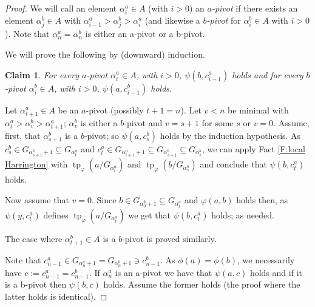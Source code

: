 \documentclass[a4paper]{amsart}
\theoremstyle{plain}
\newtheorem{claim}{Claim}[theorem]
\theoremstyle{definition}
\theoremstyle{remark}
\numberwithin{equation}{section}
\newenvironment{claimproof}[1][\proofname]
  {%
    \proof[#1]%
      \renewcommand*\qedsymbol{$\square$ (claim)}%
  }
  {%
    \endproof%
  }
\DeclareMathOperator{\tp}{tp}
\begin{document}
\begin{proof}
We will call an element $\alpha_i^a\in A$ (with $i>0$) an \emph{$a$-pivot} if there exists an element $\alpha_j^b\in A$ with $\alpha^a_{i-1}>\alpha_j^b>\alpha_i^a$ (and likewise a \emph{$b$-pivot} for $\alpha_i^b\in A$ with $i>0$). Note that $\alpha^a_n=\alpha^b_n$ is either an a-pivot or a b-pivot.

We will prove the following by (downward) induction.
\begin{claim}
For every $a$-pivot $\alpha_i^a\in A$, with $i>0$, $\psi(b,c^a_{i-1})$ holds and for every $b$-pivot $\alpha_i^b\in A$, with $i>0$, $\psi(a,c^b_{i-1})$ holds.
\end{claim}
\begin{claimproof}
%
%
%
Let $\alpha^a_{t+1}\in A$ be an $a$-pivot (possibly $t+1=n$). Let $v<n$ be minimal with $\alpha^a_t>\alpha^b_{v}>\alpha^a_{t+1}$; $\alpha^b_v$ is either a $b$-pivot and $v=s+1$ for some $s$ or $v=0$. Assume, first, that $\alpha^b_{s+1}$ is a $b$-pivot; so $\psi(a,c^b_s)$ holds by the induction hypothesis. As $c^b_s\in G_{\alpha^b_{s+1}+1}\subseteq G_{\alpha_t^a}$ and $c^a_t\in G_{\alpha^a_{t+1}+1}\subseteq G_{\alpha^b_{s+1}}\subseteq G_{\alpha^b_s}$, we can apply Fact \ref{F:local Harrington} with $\tp_\varphi(a/G_{\alpha^a_t})$ and $\tp_\varphi(b/G_{\alpha^b_s})$ and conclude that $\psi(b,c^a_t)$ holds.  

Now assume that $v=0$. Since $b\in G_{\alpha^b_0+1}\subseteq G_{\alpha^a_t}$ and $\varphi(a,b)$ holds then, as $\psi(y,c^a_t)$ defines $\tp_\varphi (a/G_{\alpha^a_t})$ we get that $\psi(b,c^a_t)$ holds; as needed.

The case where $\alpha^b_{t+1}\in A$ is a $b$-pivot is proved similarly.
\end{claimproof}

Note that $c^a_{n-1}\in G_{\alpha^a_n+1}=G_{\alpha^b_n+1}\ni c^b_{n-1}$. As $\phi(a)=\phi(b)$, we necessarily have $c:=c^a_{n-1}=c^b_{n-1}$.
 If $\alpha^a_n$ is an a-pivot we have that $\psi(a,c)$ holds and if it is a b-pivot then $\psi(b,c)$ holds. Assume the former holds (the proof where the latter holds is identical).
 

\end{proof}
\end{document}
